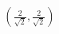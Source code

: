 \documentclass[preview]{standalone}
\begin{document}
\begin{align*}
\left(\frac{2}{\sqrt{2}} , \frac{2}{\sqrt{2}}\right)
\end{align*}
\end{document}
